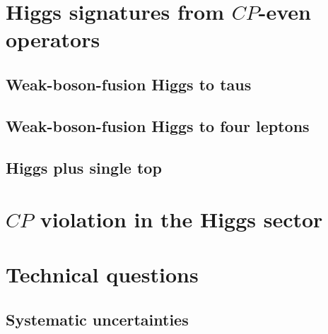 \section{Higgs signatures from $CP$-even operators}
\label{sec:information_application}

\subsection{Weak-boson-fusion Higgs to taus}
\label{sec:information_wbf_taus}

\subsection{Weak-boson-fusion Higgs to four leptons}
\label{sec:information_wbf_4l}

\subsection{Higgs plus single top}
\label{sec:information_th}



\section{$CP$ violation in the Higgs sector}
\label{sec:information_CPV}




\section{Technical questions}
\label{sec:information_extensions}

\subsection{Systematic uncertainties}

